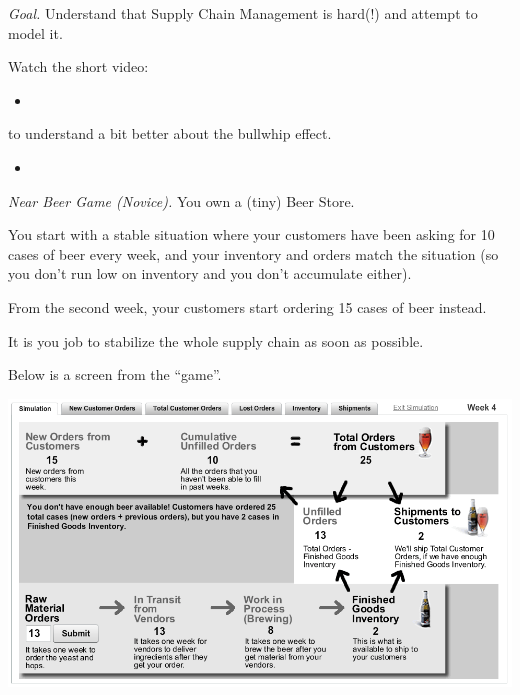 \emph{Goal. } Understand that Supply Chain Management is hard(!) and attempt to model it. \\


\begin{video}
Watch the short video:
\begin{itemize}
	\item {}
\end{itemize}
to understand a bit better about the bullwhip effect.
\end{video}

\begin{emphbox}[Read.]
\begin{itemize}
	\item {}
\end{itemize}
\end{emphbox}






\vfill
\emph{Near Beer Game (Novice). } You own a (tiny) Beer Store.

You start with a stable situation where your customers have been asking for 10 cases of beer every week, and your inventory and orders match the situation (so you don't run low on inventory and you don't accumulate either).

From the second week, your customers start ordering 15 cases of beer instead.

It is you job to stabilize the whole supply chain as soon as possible.

Below is a screen from the ``game''.
\begin{graybox}
\begin{center}
\includegraphics*[width=400pt]{images/project-bullwhip-Near_Beer_Game.png}
\end{center}
\end{graybox}


